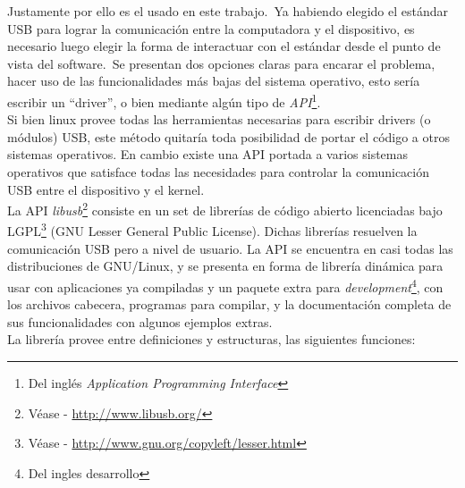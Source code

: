 Justamente por ello es el usado en este trabajo.\ Ya habiendo elegido el
est\'andar USB para lograr la comunicaci\'on entre la computadora y el
dispositivo, es necesario luego elegir la forma de interactuar con el
est\'andar desde el punto de vista del software.\ Se presentan dos opciones
claras para encarar el problema, hacer uso de las funcionalidades m\'as bajas
del sistema operativo, esto ser\'ia escribir un ``driver'', o bien mediante
alg\'un tipo de \emph{API}\footnote{Del ingl\'es \emph{Application Programming
Interface}}.\\

Si bien linux provee todas las herramientas necesarias para escribir drivers (o
m\'odulos) USB, este m\'etodo quitar\'ia toda posibilidad de portar el c\'odigo
a otros sistemas operativos. En cambio existe una API portada a varios sistemas
operativos que satisface todas las necesidades para controlar la
comunicaci\'on USB entre el dispositivo y el kernel.\\

La API \emph{libusb}\footnote{V\'ease - \url{http://www.libusb.org/}} consiste
en un set de librer\'ias de c\'odigo abierto licenciadas bajo
LGPL\footnote{V\'ease - \url{http://www.gnu.org/copyleft/lesser.html}} (GNU
Lesser General Public License). 
Dichas librer\'ias resuelven la comunicaci\'on USB pero a nivel de usuario.
La API se encuentra en casi todas las distribuciones de GNU/Linux, y se
presenta en forma de librer\'ia din\'amica para usar con aplicaciones ya
compiladas y un paquete extra para \emph{development}\footnote{Del ingles
desarrollo}, con los archivos cabecera, programas para compilar, y
la documentaci\'on completa de sus funcionalidades con algunos ejemplos
extras.\\

La librer\'ia provee entre definiciones y estructuras, las siguientes
funciones:

